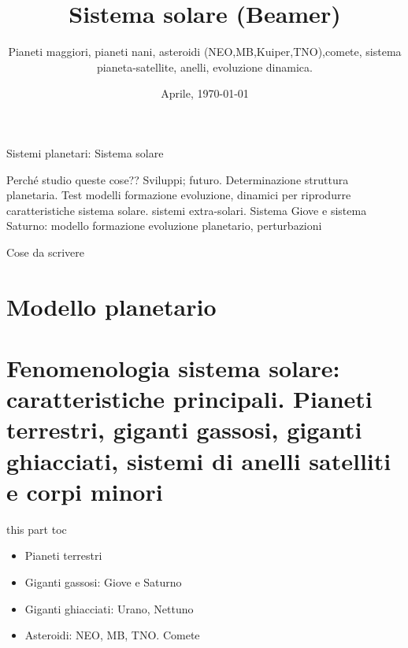 \documentclass[10pt,xcolor={usenames},fleqn,mathserif,serif]{beamer}
\title{Sistema solare (Beamer)}
\subtitle{Pianeti maggiori, pianeti nani, asteroidi (NEO,MB,Kuiper,TNO),comete, sistema pianeta-satellite, anelli, evoluzione dinamica.}
\date{Aprile, \today}
\begin{document}



\begin{frame}
  \titlepage
\end{frame}


\begin{frame}[label={argomenti}]{Sistemi planetari: Sistema solare}
\tableofcontents[onlyparts]
\end{frame}

\begin{wordonframe}{Perch\'e studio queste cose?? Sviluppi; futuro.}
Determinazione struttura planetaria.
Test modelli formazione evoluzione, dinamici per  riprodurre caratteristiche sistema solare. sistemi extra-solari.
Sistema Giove e sistema Saturno: modello formazione evoluzione planetario, perturbazioni
\end{wordonframe}

\begin{frame}{Cose da scrivere}
\listofframes
\end{frame}


\part{Modello planetario}\label{part:planetarymodel}



\part{Fenomenologia sistema solare: caratteristiche principali. Pianeti terrestri, giganti gassosi, giganti ghiacciati, sistemi di anelli satelliti e corpi minori}\label{part:solsys}

\begin{frame}{this part toc}
\begin{itemize}
\item Pianeti terrestri
\item Giganti gassosi: Giove e Saturno
\item Giganti ghiacciati: Urano, Nettuno
\item Asteroidi: NEO, MB, TNO. Comete
\end{itemize}
\end{frame}
\end{document}
